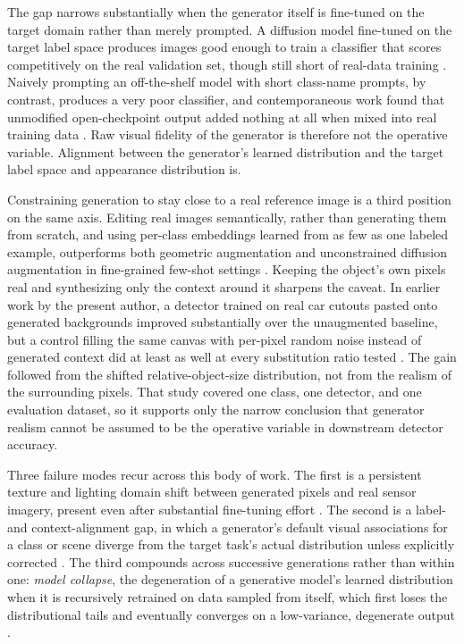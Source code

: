 The gap narrows substantially when the generator itself is fine-tuned on the target domain rather than merely prompted. A diffusion model fine-tuned on the target label space produces images good enough to train a classifier that scores competitively on the real validation set, though still short of real-data training \cite{aziziSyntheticDataDiffusion2023}. Naively prompting an off-the-shelf model with short class-name prompts, by contrast, produces a very poor classifier, and contemporaneous work found that unmodified open-checkpoint output added nothing at all when mixed into real training data \cite{aziziSyntheticDataDiffusion2023}. Raw visual fidelity of the generator is therefore not the operative variable. Alignment between the generator's learned distribution and the target label space and appearance distribution is.

Constraining generation to stay close to a real reference image is a third position on the same axis. Editing real images semantically, rather than generating them from scratch, and using per-class embeddings learned from as few as one labeled example, outperforms both geometric augmentation and unconstrained diffusion augmentation in fine-grained few-shot settings \cite{trabuccoEffectiveDataAugmentation2025}. Keeping the object's own pixels real and synthesizing only the context around it sharpens the caveat. In earlier work by the present author, a detector trained on real car cutouts pasted onto generated backgrounds improved substantially over the unaugmented baseline, but a control filling the same canvas with per-pixel random noise instead of generated context did at least as well at every substitution ratio tested \cite{hedrichGeneratingSyntheticDatasets2026}. The gain followed from the shifted relative-object-size distribution, not from the realism of the surrounding pixels. That study covered one class, one detector, and one evaluation dataset, so it supports only the narrow conclusion that generator realism cannot be assumed to be the operative variable in downstream detector accuracy.

Three failure modes recur across this body of work. The first is a persistent texture and lighting domain shift between generated pixels and real sensor imagery, present even after substantial fine-tuning effort \cite{aziziSyntheticDataDiffusion2023}. The second is a label- and context-alignment gap, in which a generator's default visual associations for a class or scene diverge from the target task's actual distribution unless explicitly corrected \cite{heSyntheticDataGenerative2023,aziziSyntheticDataDiffusion2023}. The third compounds across successive generations rather than within one: \textit{model collapse}, the degeneration of a generative model's learned distribution when it is recursively retrained on data sampled from itself, which first loses the distributional tails and eventually converges on a low-variance, degenerate output \cite{shumailovAIModelsCollapse2024}.

